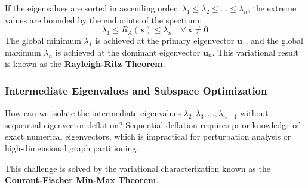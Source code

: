 If the eigenvalues are sorted in ascending order, $\lambda_1 \le \lambda_2 \le \dots \le \lambda_n$, the extreme values are bounded by the endpoints of the spectrum:
\begin{equation}
\lambda_1 \le R_A(\mathbf{x}) \le \lambda_n \quad \forall \, \mathbf{x} \ne \mathbf{0}
\label{eq:rayleigh_ritz_inequality}
\end{equation}
The global minimum $\lambda_1$ is achieved at the primary eigenvector $\mathbf{u}_1$, and the global maximum $\lambda_n$ is achieved at the dominant eigenvector $\mathbf{u}_n$. This variational result is known as the \textbf{Rayleigh-Ritz Theorem}.

\subsubsection{Intermediate Eigenvalues and Subspace Optimization}
How can we isolate the intermediate eigenvalues $\lambda_2, \lambda_3, \dots, \lambda_{n-1}$ without sequential eigenvector deflation? Sequential deflation requires prior knowledge of exact numerical eigenvectors, which is impractical for perturbation analysis or high-dimensional graph partitioning.

This challenge is solved by the variational characterization known as the \textbf{Courant-Fischer Min-Max Theorem}.


